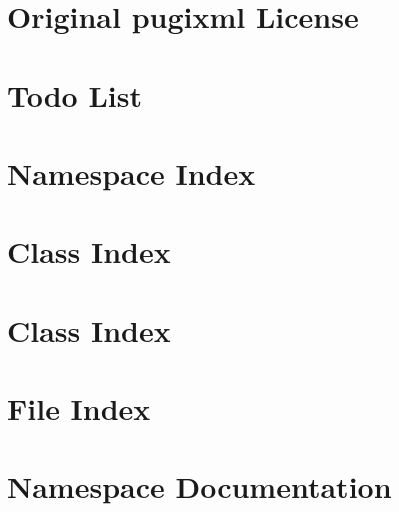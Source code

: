 \documentclass[a4paper]{article}
\begin{document}
\section{Original pugixml License}
\label{OriginalpugixmlLicense}
\hypertarget{OriginalpugixmlLicense}{}

\section{Todo List}
\label{todo}
\hypertarget{todo}{}

\section{Namespace Index}

\section{Class Index}

\section{Class Index}

\section{File Index}

\section{Namespace Documentation}










\end{document}
